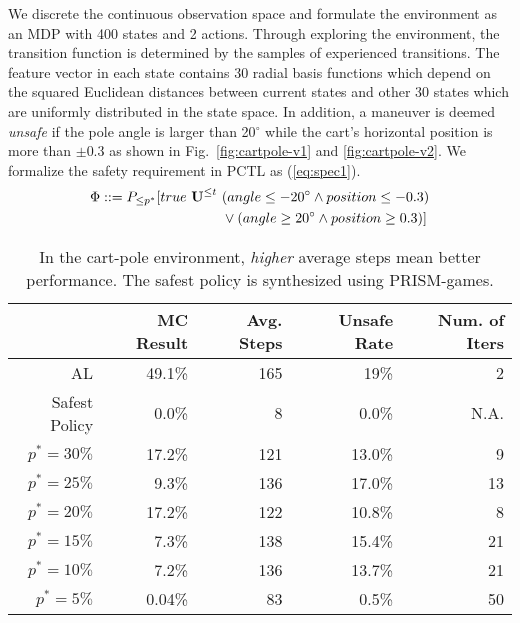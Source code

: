 {We discrete the continuous observation space and formulate the environment as an MDP with 400 states and 2 actions. Through exploring the environment, the transition function is determined by the samples of experienced transitions. The feature vector in each state contains $30$ radial basis functions which depend on the squared Euclidean distances between current states and other $30$ states which are uniformly distributed in the state space. In addition, a maneuver is deemed {\it unsafe} if the pole angle is larger than 20$^\circ$ while the cart's horizontal position is more than $\pm 0.3$ as shown in Fig.~\ref{fig:cartpole-v1} and \ref{fig:cartpole-v2}. We formalize the safety requirement in PCTL as (\ref{eq:spec1}).
\begin{equation}
\begin{split}
\Phi ::= P_{\leq p^*}[true\ {\textbf{U}}^{\leq t}\ &(angle\leq -20^\circ\wedge position\leq-0.3)\\
&\vee(angle\geq 20^\circ\wedge position\geq 0.3)]
\end{split}
\label{eq:spec1}
\end{equation}

\begin{table}[htb]
\begin{center}
\caption{In the cart-pole environment, {\it higher} average steps mean better performance. The safest policy is synthesized using PRISM-games.}
\begin{tabular}{|r|r|r|r|r|}
\hline
  &\small{\ \ MC Result} &\small{\ \ Avg. Steps}  &\small{\ \ Unsafe Rate} &\small{\ \ Num. of Iters}\\
\hline
AL &49.1\%& 165 &  19\% & 2\\
\hline
Safest Policy  & 0.0\% & 8 & 0.0\% & N.A.\\
\hline
$p^*=30\%$ & 17.2\%  & 121 & 13.0\% & 9\\
\hline
$p^*=25\%$ & 9.3\%  & 136 & 17.0\% & 13\\
\hline
$p^*=20\%$ & 17.2\% & 122 & 10.8\% & 8\\
\hline
$p^*=15\%$ & 7.3\% & 138 & 15.4\% & 21\\
\hline
$p^*=10\%$ & 7.2\% & 136 & 13.7\% & 21\\
\hline
$p^*=5\%$ & 0.04\% & 83 & 0.5\% & 50\\
\hline
\end{tabular}
\label{tab:cartpole1}
\end{center}
\end{table}

}
